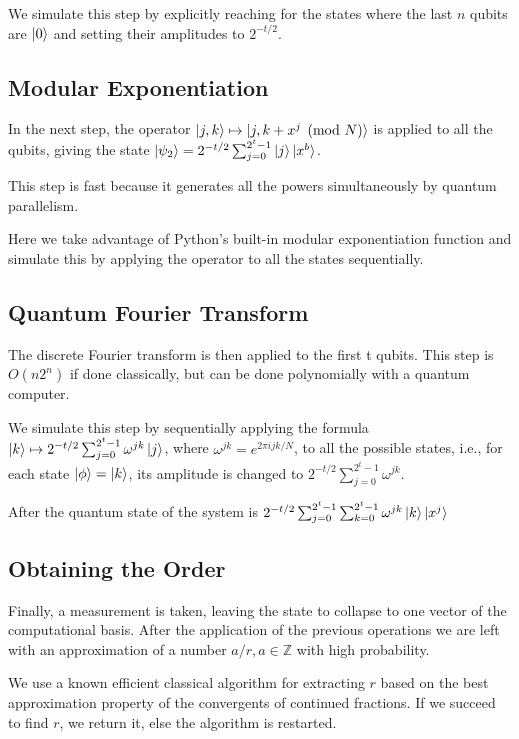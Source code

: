 \documentclass{article}
\begin{document}
We simulate this step by explicitly reaching for the states where the last $n$
qubits are $\ket{0}$ and setting their amplitudes to $2^{-t/2}$.

\subsection{Modular Exponentiation}

In the next step, the operator $\ket{j, k} \mapsto \ket{j, k + x^j \pmod N}$ is
applied to all the qubits, giving the state
$\ket{\psi_2} =
2^{-t/2}\sum_{j=0}^{2^t-1}\ket{j}\ket{x^b}$.

This step is fast because it generates all the powers
simultaneously by quantum parallelism.

Here we take advantage of Python's built-in modular exponentiation function and
simulate this by applying the operator to all the states sequentially.

\subsection{Quantum Fourier Transform}
The discrete Fourier transform is then applied to the first t qubits. This step
is $O(n2^{n})$ if done classically, but can be done polynomially with a quantum
computer.

We simulate this step by sequentially applying the formula
$\ket{k} \mapsto 2^{-t/2} \sum_{j=0}^{2^{t}-1}\omega^{jk}\ket{j}$, where
$\omega^{jk} = e^{2\pi i j k / N}$,
to all the possible states, i.e., for each state $\ket{\phi} = \ket{k}$, its
amplitude is changed to $2^{-t/2} \sum_{j=0}^{2^{t}-1}\omega^{jk}$.

After the quantum state of the system is
$2^{-t/2}\sum_{j=0}^{2^{t}-1}\sum_{k=0}^{2^{t}-1}\omega^{jk}\ket{k}\ket{x^{j}}$


\subsection{Obtaining the Order}
Finally, a measurement is taken, leaving the state to collapse to one vector of
the computational basis. After the application of the previous operations we are
left with an approximation of a number $a/r, a \in \mathbb{Z}$ with high
probability.

We use a known efficient classical algorithm \cite{HW} for extracting $r$ based
on the best approximation property of the convergents of continued fractions. If
we succeed to find $r$, we return it, else the algorithm is restarted.
\end{document}

